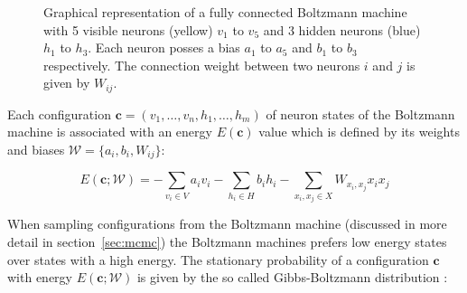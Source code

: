 \begin{figure}[h]
    \label{fig:boltzmannMachine}
    \centering
    \caption{Graphical representation of a fully connected Boltzmann machine with 5 visible neurons (yellow) $v_1$ to $v_5$
    and 3 hidden neurons (blue) $h_1$ to $h_3$. Each neuron posses a bias
    $a_1$ to $a_5$ and $b_1$ to $b_3$ respectively. The connection weight between two neurons $i$ and $j$
    is given by $W_{ij}$.}
\end{figure}

Each configuration $\bm{c}=(v_1,\dots,v_n,h_1,\dots,h_m)$ of neuron states
of the Boltzmann machine is associated with an energy $E(\bm{c})$ value
which is defined by its weights and biases $\mathcal{W} = \{a_i, b_i, W_{ij}\}$:

\begin{equation}
  E(\bm{c};\mathcal{W}) = - \sum_{v_i \in V} a_{i}v_{i} - \sum_{h_i \in H} b_{i}h_{i} - \sum_{x_i,x_j \in X} W_{x_i,x_j}x_{i}x_{j}
\end{equation}

When sampling configurations from the Boltzmann machine (discussed in more detail in section~\ref{sec:mcmc}) the 
Boltzmann machines prefers low energy states over states with a high energy. The stationary probability
of a configuration $\bm{c}$ with energy $E(\bm{c};\mathcal{W})$ is given by the so called Gibbs-Boltzmann distribution \cite{gibbs_2010}:


